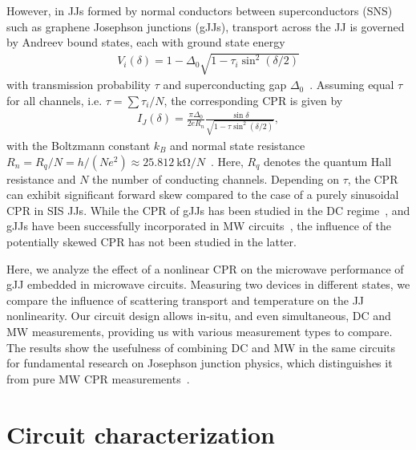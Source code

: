 However, in JJs formed by normal conductors between superconductors (SNS) such as graphene Josephson junctions (gJJs), transport across the JJ is governed by Andreev bound states, each with ground state energy
\begin{align}
V_i(\delta)=1-\Delta_0\sqrt{1-\tau_i\sin^2(\delta/2)}
\label{eq:ABSenergy}
\end{align}
%
with transmission probability $\tau$ and superconducting gap $\Delta_0$~\cite{beenakkerUniversalLimitCriticalcurrent1991,titovJosephsonEffectBallistic2006b}.
%
Assuming equal $\tau$ for all channels, i.e. $\tau=\sum\tau_i/N$, the corresponding CPR is given by
\begin{align}
I_J(\delta) = \frac{\pi\Delta_0}{2 e R_n} \frac{\sin\delta}{\sqrt{1 - \tau \sin^2(\delta / 2)}},
\label{eq:CPR-ball}
\end{align}
%
with the Boltzmann constant $k_B$ and normal state resistance $R_n= R_q/N = h/(Ne^2)\approx \SI{25.812}{\kilo\ohm} / N$~\cite{golubovCurrentphaseRelationJosephson2004a,leeUltimatelyShortBallistic2015}.
%
Here, $R_q$ denotes the quantum Hall resistance and $N$ the number of conducting channels.
%
Depending on $\tau$, the CPR can exhibit significant forward skew compared to the case of a purely sinusoidal CPR in SIS JJs.
%
While the CPR of gJJs has been studied in the DC regime~\cite{englishObservationNonsinusoidalCurrentphase2016,nandaCurrentPhaseRelationBallistic2017}, and gJJs have been successfully incorporated in MW circuits~\cite{schmidtBallisticGrapheneSuperconducting2018,krollMagneticFieldCompatible2018,wangCoherentControlHybrid2019}, the influence of the potentially skewed CPR has not been studied in the latter.

Here, we analyze the effect of a nonlinear CPR on the microwave performance of gJJ embedded in microwave circuits.
%
Measuring two devices in different states, we compare the influence of scattering transport and temperature on the JJ nonlinearity.
%
Our circuit design allows in-situ, and even simultaneous, DC and MW measurements, providing us with various measurement types to compare.
%
The results show the usefulness of combining DC and MW in the same circuits for fundamental research on Josephson junction physics, which distinguishes it from pure MW CPR measurements~\cite{rifkinCurrentphaseRelationPhasedependent1976}.

\section{Circuit characterization}

